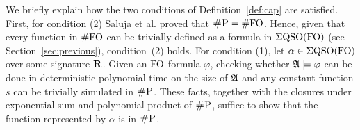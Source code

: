 We briefly explain how the two conditions of Definition~\ref{def:cap} are satisfied. First, for condition (2) Saluja et al. proved that $\text{\sc \#P} = \#{\rm FO}$\cite{SalujaST95}. Hence, given that every function in $\#{\rm FO}$ can be trivially defined as a formula in $\Sigma{\rm QSO}({\rm FO})$ (see Section~\ref{sec:previous}), condition~(2) holds.
For condition (1), let $\alpha\in\Sigma{\rm QSO}({\rm FO})$ over some signature $\mathbf{R}$. Given an ${\rm FO}$ formula $\varphi$, checking whether $\mathfrak{A}\models\varphi$ can be done in deterministic polynomial time on the size of $\mathfrak{A}$ and any constant function $s$ can be trivially simulated in $\text{\sc \#P}$. These facts, together with the closures under exponential sum and polynomial product of $\text{\sc \#P}$\cite{F97}, suffice to show that the function represented by $\alpha$ is in $\text{\sc \#P}$.
